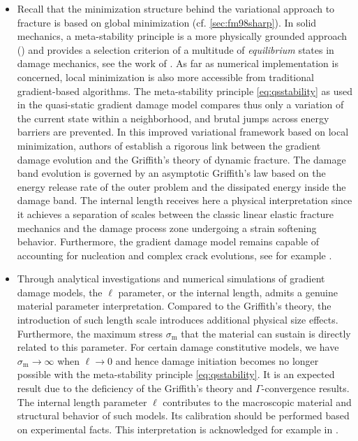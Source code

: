 \begin{itemize}
\item Recall that the minimization structure behind the variational approach to fracture is based on global minimization (cf. \cref{sec:fm98sharp}). In solid mechanics, a meta-stability principle is a more physically grounded approach (\cite{Nguyen:2000}) and provides a selection criterion of a multitude of \emph{equilibrium} states in damage mechanics, see the work of \cite{BenallalMarigo:2007}. As far as numerical implementation is concerned, local minimization is also more accessible from traditional gradient-based algorithms. The meta-stability principle \eqref{eq:qsstability} as used in the quasi-static gradient damage model compares thus only a variation of the current state within a neighborhood, and brutal jumps across energy barriers are prevented. In this improved variational framework based on local minimization, authors of \cite{SicsicMarigo:2013} establish a rigorous link between the gradient damage evolution and the Griffith's theory of dynamic fracture. The damage band evolution is governed by an asymptotic Griffith's law based on the energy release rate of the outer problem and the dissipated energy inside the damage band. The internal length receives here a physical interpretation since it achieves a separation of scales between the classic linear elastic fracture mechanics and the damage process zone undergoing a strain softening behavior. Furthermore, the gradient damage model remains capable of accounting for nucleation and complex crack evolutions, see for example \cite{MauriniBourdinGauthierLazarus:2013,SicsicMarigoMaurini:2013,MesgarnejadBourdinKhonsari:2013,BourdinMarigoMauriniSicsic:2014,Baldelli:2014}.

\item Through analytical investigations \cite{PhamMarigoMaurini:2011,PhamMarigo:2013} and numerical simulations \cite{AmorMarigoMaurini:2009,PhamAmorMarigoMaurini:2011} of gradient damage models, the $\ell$ parameter, or the internal length, admits a genuine material parameter interpretation. Compared to the Griffith's theory, the introduction of such length scale introduces additional physical size effects. Furthermore, the maximum stress $\sigma_\mathrm{m}$ that the material can sustain is directly related to this parameter. For certain damage constitutive models, we have $\sigma_\mathrm{m}\to\infty$ when $\ell\to 0$ and hence damage initiation becomes no longer possible with the meta-stability principle \eqref{eq:qsstability}. It is an expected result due to the deficiency of the Griffith's theory and $\Gamma$-convergence results. The internal length parameter $\ell$ contributes to the macroscopic material and structural behavior of such models. Its calibration should be performed based on experimental facts. This interpretation is acknowledged for example in \cite{LancioniRoyer-Carfagni:2009,FreddiRoyer-Carfagni:2010,PhamAmorMarigoMaurini:2011}.
\end{itemize}

